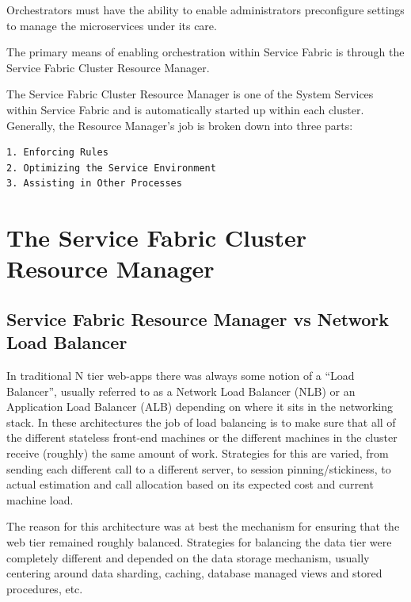 Orchestrators must have the ability to enable administrators
preconfigure settings to manage the microservices under its care.

The primary means of enabling orchestration within Service Fabric is
through the Service Fabric Cluster Resource Manager.

The Service Fabric Cluster Resource Manager is one of the System
Services within Service Fabric and is automatically started up within
each cluster.  Generally, the Resource Manager’s job is broken down
into three parts:

\begin{verbatim}
1. Enforcing Rules
2. Optimizing the Service Environment
3. Assisting in Other Processes
\end{verbatim}

\section{The Service Fabric Cluster Resource Manager}

\subsection{Service Fabric Resource Manager vs Network Load Balancer}

In traditional N tier web-apps there was always some notion of a “Load
Balancer”, usually referred to as a Network Load Balancer (NLB) or an
Application Load Balancer (ALB) depending on where it sits in the
networking stack. In these architectures the job of load balancing is
to make sure that all of the different stateless front-end machines or
the different machines in the cluster receive (roughly) the same
amount of work. Strategies for this are varied, from sending each
different call to a different server, to session pinning/stickiness,
to actual estimation and call allocation based on its expected cost
and current machine load.

The reason for this architecture was at best the mechanism for
ensuring that the web tier remained roughly balanced. Strategies for
balancing the data tier were completely different and depended on the
data storage mechanism, usually centering around data sharding,
caching, database managed views and stored procedures, etc.


